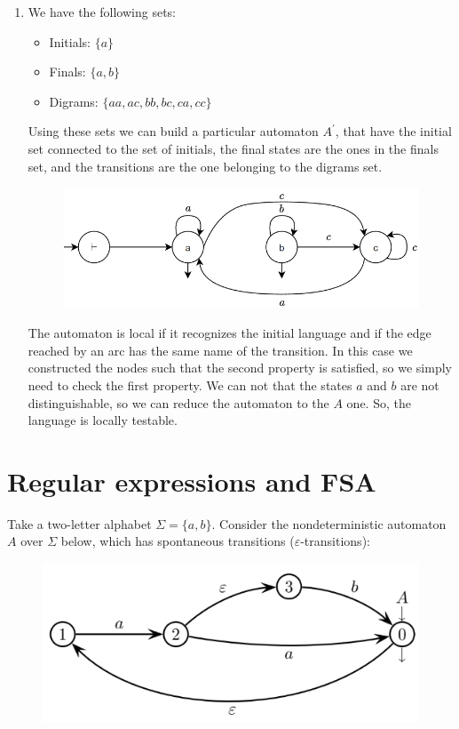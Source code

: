 \documentclass[12pt, a4paper]{report}
\newtheorem[style=M,bodystyle=\normalfont]{theorem}{Theorem}
\newtheorem[style=M,bodystyle=\normalfont]{corollary}{Corollary}
\newtheorem[style=M,bodystyle=\normalfont]{lemma}{Lemma}
\newtheorem[style=M,bodystyle=\normalfont]{definition}{Definition}
\begin{document}
\begin{enumerate}
        \item We have the following sets: 
            \begin{itemize}
                \item Initials: $\{a\}$
                \item Finals: $\{a,b\}$
                \item Digrams: $\{aa,ac,bb,bc,ca,cc\}$
            \end{itemize}
            Using these sets we can build a particular automaton $A^{'}$, that have the initial set connected to the set of initials, the final states are the ones in the finals set, and the transitions are the
            one belonging to the digrams set. 
            \begin{figure}[H]
                \centering
                \includegraphics[width=0.75\linewidth]{images/FSA6.png}
            \end{figure}
            The automaton is local if it recognizes the initial language and if the edge reached by an arc has the same name of the transition. In this case we constructed the nodes such that the second property is 
            satisfied, so we simply need to check the first property. We can not that the states $a$ and $b$ are not distinguishable, so we can reduce the automaton to the $A$ one. So, the language is locally testable. 
    \end{enumerate}

    \newpage

    \section{Regular expressions and FSA}
    Take a two-letter alphabet $\Sigma=\{a,b\}$.  Consider the nondeterministic automaton $A$ over $\Sigma$ below, which has spontaneous transitions ($\varepsilon$-transitions): 
    \begin{figure}[H]
        \centering
        \includegraphics[width=0.75\linewidth]{images/FSA1a.png}
    \end{figure}
\end{document}
